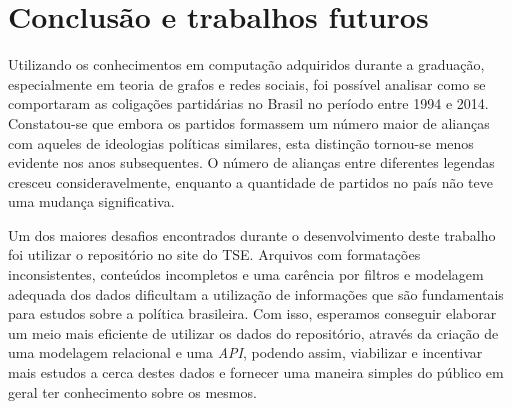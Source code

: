 \chapter{Conclusão e trabalhos futuros}
\label{conclusao}


Utilizando os conhecimentos em computação adquiridos durante a graduação, especialmente em teoria de grafos e redes sociais, foi possível analisar como se comportaram as coligações partidárias no Brasil no período entre 1994 e 2014. Constatou-se que embora os partidos formassem um número maior de alianças com aqueles de ideologias políticas similares, esta distinção tornou-se menos evidente nos anos subsequentes. O número de alianças entre diferentes legendas cresceu consideravelmente, enquanto a quantidade de partidos no país não teve uma mudança significativa.

Um dos maiores desafios encontrados durante o desenvolvimento deste trabalho foi utilizar o repositório no site do \gls{TSE}. Arquivos com formatações inconsistentes, conteúdos incompletos e uma carência por filtros e modelagem adequada dos dados dificultam a utilização de informações que são fundamentais para estudos sobre a política brasileira. Com isso, esperamos conseguir elaborar um meio mais eficiente de utilizar os dados do repositório, através da criação de uma modelagem relacional e uma \emph{API}, podendo assim,  viabilizar e incentivar mais estudos a cerca destes dados e fornecer uma maneira simples do público em geral ter conhecimento sobre os mesmos.



